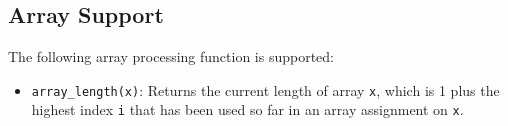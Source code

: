 \subsection*{Array Support}

The following array processing function is supported:

\begin{itemize}
\item \lstinline{array_length(x)}: Returns the current length of array \lstinline{x}, which is 1 plus the
highest index \lstinline{i} that has been used so far in an array assignment on \lstinline{x}.
\end{itemize}

  


